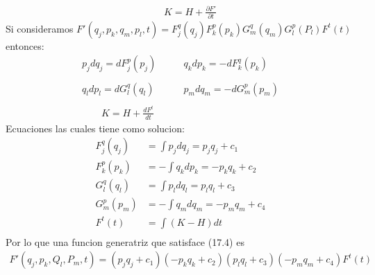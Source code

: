 \documentclass[a4paper]{article}
\begin{document}
\begin{answer}[Punto 3]
\begin{align*}
            \qquad K = H+\frac{\partial F'}{\partial t}
        \end{align*}
    Si consideramos $F'(q_j, p_k,q_m, p_l,  t) = F^{q}_j(q_j)F^{p}_k(p_k)G^{q}_m(q_m)G^{p}_l(P_l)F^t(t)$ entonces:
    \begin{align*}
        p_jdq_j = dF^p_j(p_j) & \qquad q_kdp_k = -dF^q_k(p_k) \\\\
        q_ldp_l = dG^q_l(q_l) & \qquad p_m dq_m= -dG^p_m(p_m) \\\\
        \qquad K = H+\frac{dF^t}{dt}
    \end{align*}
    Ecuaciones las cuales tiene como solucion:
    \begin{align*}
        F^q_j(q_j) &= \int p_j dq_j = p_jq_j + c_1\\
        F^p_k(p_k) &= -\int q_k dp_k = - p_k q_k + c_2\\
        G^q_l(q_l) &= \int p_l dq_l = p_lq_l + c_3\\
        G^p_m(p_m) &= -\int q_m dq_m  = -p_m q_m + c_4\\
        F^t(t) &= \int (K-H) dt\\
    \end{align*}
    Por lo que una funcion generatriz que satisface (17.4) es
    \begin{align*}
        F'(q_j, p_k, Q_l, P_m, t) = (p_j q_j + c_1)(- p_k q_k + c_2)(p_l q_l + c_3)(-p_m q_m + c_4) F^t(t)
    \end{align*}
    \end{answer}
    
\end{document}
